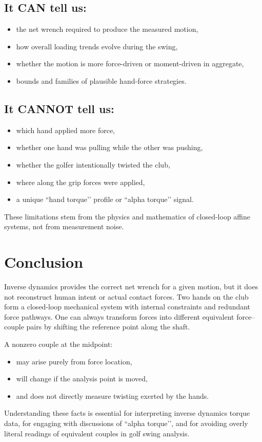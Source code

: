 \documentclass[12pt]{article}
\begin{document}
\subsection*{It CAN tell us:}
\begin{itemize}
    \item the net wrench required to produce the measured motion,
    \item how overall loading trends evolve during the swing,
    \item whether the motion is more force-driven or moment-driven in aggregate,
    \item bounds and families of plausible hand-force strategies.
\end{itemize}

\subsection*{It CANNOT tell us:}
\begin{itemize}
    \item which hand applied more force,
    \item whether one hand was pulling while the other was pushing,
    \item whether the golfer intentionally twisted the club,
    \item where along the grip forces were applied,
    \item a unique ``hand torque’’ profile or ``alpha torque’’ signal.
\end{itemize}

These limitations stem from the physics and mathematics of closed-loop affine systems, not from measurement noise.

\section{Conclusion}

Inverse dynamics provides the correct net wrench for a given motion, but it does not reconstruct human intent or actual contact forces.  
Two hands on the club form a closed-loop mechanical system with internal constraints and redundant force pathways.  
One can always transform forces into different equivalent force--couple pairs by shifting the reference point along the shaft.

A nonzero couple at the midpoint:
\begin{itemize}
    \item may arise purely from force location,
    \item will change if the analysis point is moved,
    \item and does not directly measure twisting exerted by the hands.
\end{itemize}

Understanding these facts is essential for interpreting inverse dynamics torque data, for engaging with discussions of ``alpha torque’’, and for avoiding overly literal readings of equivalent couples in golf swing analysis.
\end{document}
